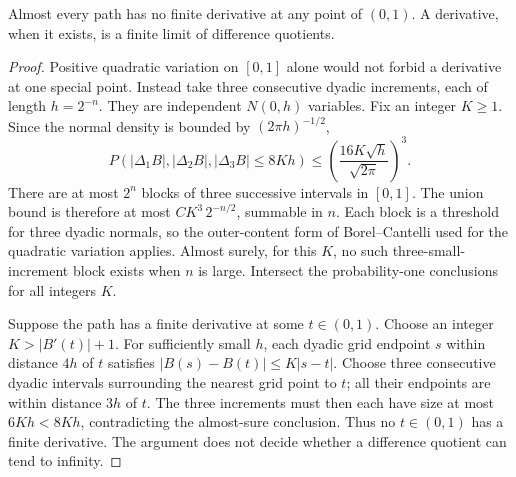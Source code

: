 \begin{theorem}\label{thm:pwz}
Almost every path has no finite derivative at any point of $(0,1)$. A derivative, when it exists, is a finite limit of difference quotients.
\end{theorem}
\begin{proof}
Positive quadratic variation on $[0,1]$ alone would not forbid a derivative at one special point. Instead take three consecutive dyadic increments, each of length $h=2^{-n}$. They are independent $N(0,h)$ variables. Fix an integer $K\ge1$. Since the normal density is bounded by $(2\pi h)^{-1/2}$,
\[
 P(|\Delta_1B|,|\Delta_2B|,|\Delta_3B|\le8Kh)
 \le\left(\frac{16K\sqrt h}{\sqrt{2\pi}}\right)^3.
\]
There are at most $2^n$ blocks of three successive intervals in $[0,1]$. The union bound is therefore at most $CK^3\,2^{-n/2}$, summable in $n$. Each block is a threshold for three dyadic normals, so the outer-content form of Borel--Cantelli used for the quadratic variation applies. Almost surely, for this $K$, no such three-small-increment block exists when $n$ is large. Intersect the probability-one conclusions for all integers $K$.

Suppose the path has a finite derivative at some $t\in(0,1)$. Choose an integer $K>|B'(t)|+1$. For sufficiently small $h$, each dyadic grid endpoint $s$ within distance $4h$ of $t$ satisfies $|B(s)-B(t)|\le K|s-t|$. Choose three consecutive dyadic intervals surrounding the nearest grid point to $t$; all their endpoints are within distance $3h$ of $t$. The three increments must then each have size at most $6Kh<8Kh$, contradicting the almost-sure conclusion. Thus no $t\in(0,1)$ has a finite derivative. The argument does not decide whether a difference quotient can tend to infinity.
\end{proof}

